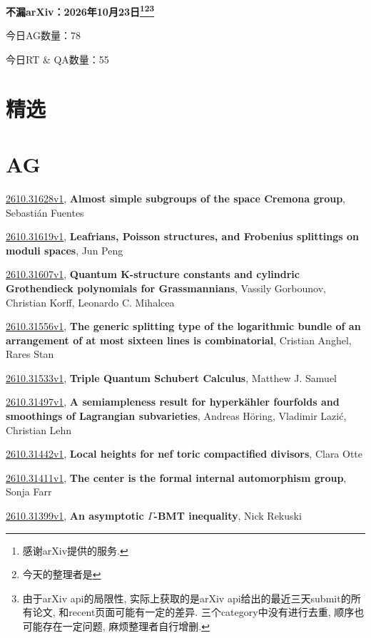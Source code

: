\documentclass[9pt, a4paper]{article}
\theoremstyle{plain}
\theoremstyle{definition}
\theoremstyle{remark}
\newcommand{\arxiv}[3]{\href{https://arxiv.org/abs/#1}{#1}, \textbf{\textcolor{arxivblue}{#2}}, #3}
\newcommand{\AGnumber}{78}
\newcommand{\RTQAnumber}{55}
\newcommand{\NewestDate}{2026年10月23日}
\newcommand{\todayarXiver}{} %
\begin{document}
\begin{center}
    \Huge\textbf{不漏arXiv：\NewestDate\footnote{感谢arXiv提供的服务.}\footnote{今天的整理者是\todayarXiver}\footnote{由于arXiv api的局限性, 实际上获取的是arXiv api给出的最近三天submit的所有论文, 和recent页面可能有一定的差异. 三个category中没有进行去重, 顺序也可能存在一定问题, 麻烦整理者自行增删.}} \\
\end{center}

\setcounter{section}{-1}

\begin{center}
    今日AG数量：\AGnumber
    
    今日RT \& QA数量：\RTQAnumber
    
\end{center}


\section{精选}


\section{AG}
\arxiv{2610.31628v1}{Almost simple subgroups of the space Cremona group}{Sebastián Fuentes}

\arxiv{2610.31619v1}{Leafrians, Poisson structures, and Frobenius splittings on moduli spaces}{Jun Peng}

\arxiv{2610.31607v1}{Quantum K-structure constants and cylindric Grothendieck polynomials for Grassmannians}{Vassily Gorbounov, Christian Korff, Leonardo C. Mihalcea}

\arxiv{2610.31556v1}{The generic splitting type of the logarithmic bundle of an arrangement of at most sixteen lines is combinatorial}{Cristian Anghel, Rares Stan}

\arxiv{2610.31533v1}{Triple Quantum Schubert Calculus}{Matthew J. Samuel}

\arxiv{2610.31497v1}{A semiampleness result for hyperkähler fourfolds and smoothings of Lagrangian subvarieties}{Andreas Höring, Vladimir Lazić, Christian Lehn}

\arxiv{2610.31442v1}{Local heights for nef toric compactified divisors}{Clara Otte}

\arxiv{2610.31411v1}{The center is the formal internal automorphism group}{Sonja Farr}

\arxiv{2610.31399v1}{An asymptotic $Γ$-BMT inequality}{Nick Rekuski}
\end{document}
